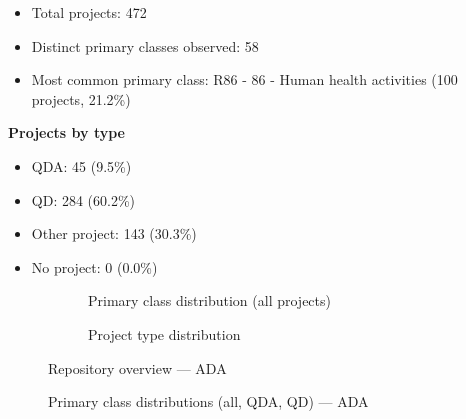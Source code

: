 \begin{itemize}
    \item Total projects: 472
    \item Distinct primary classes observed: 58
    \item Most common primary class: R86 - 86 - Human health activities (100 projects, 21.2\%)
\end{itemize}

\textbf{Projects by type}

\begin{itemize}
    \item QDA: 45 (9.5\%)
    \item QD: 284 (60.2\%)
    \item Other project: 143 (30.3\%)
    \item No project: 0 (0.0\%)
\end{itemize}

\begin{figure}[H]
    \centering
    \begin{subfigure}[t]{0.49\textwidth}
        \centering
        
        \caption{Primary class distribution (all projects)}
    \end{subfigure}
    \hfill
    \begin{subfigure}[t]{0.49\textwidth}
        \centering
        
        \caption{Project type distribution}
    \end{subfigure}
    \caption{Repository overview --- ADA}
\end{figure}

\clearpage

\begin{figure}[H]
    \centering
    
    \par\vspace{0.8em}
    
    \par\vspace{0.8em}
    
    \caption{Primary class distributions (all, QDA, QD) --- ADA}
\end{figure}

\clearpage

